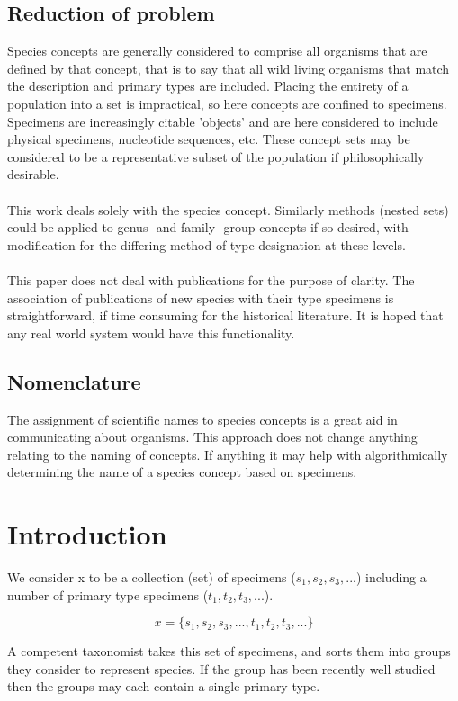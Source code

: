\documentclass{article}
\begin{document}
   \subsection{Reduction of problem}
   Species concepts are generally considered to comprise all organisms that are defined by that concept, that is to say that all wild living organisms that match the description and primary types are included. Placing the entirety of a population into a set is impractical, so here concepts are confined to specimens. Specimens are increasingly citable 'objects' and are here considered to include physical specimens, nucleotide sequences, etc. These concept sets may be considered to be a representative subset of the population if philosophically desirable.
   \paragraph{}
   This work deals solely with the species concept. Similarly methods (nested sets) could be applied to genus- and family- group concepts if so desired, with modification for the differing method of type-designation at these levels.
   \paragraph{}
   This paper does not deal with publications for the purpose of clarity. The association of publications of new species with their type specimens is straightforward, if time consuming for the historical literature. It is hoped that any real world system would have this functionality.
   \subsection{Nomenclature}
   The assignment of scientific names to species concepts is a great aid in communicating about organisms. This approach does not change anything relating to the naming of concepts. If anything it may help with algorithmically determining the name of a species concept based on specimens.
   \section{Introduction}
   We consider x to be a collection (set) of specimens ($s_1, s_2, s_3, ...$) including a number of primary type specimens ($t_1, t_2, t_3, ...$).
   
   \[x = \{s_1, s_2, s_3, ..., t_1, t_2, t_3, ...\}\]
   
   A competent taxonomist takes this set of specimens, and sorts them into groups they consider to represent species. If the group has been recently well studied then the groups may each contain a single primary type.
\end{document}
